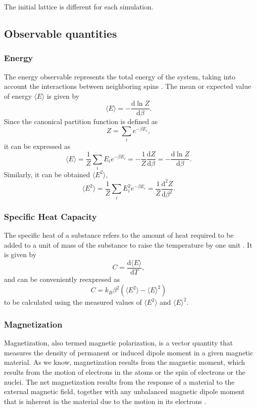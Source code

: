 \documentclass[
    10pt,
    journal,
    compsoc,
    english
]{IEEEtran}
\begin{document}
The initial lattice is different for each simulation.

\subsection{Observable quantities}
\subsubsection{Energy}
The energy observable represents the total energy of the system, taking into account the interactions between neighboring spins \cite{Blundell}. The mean or expected value of energy  $\langle E \rangle$ is given by 
\[\langle E \rangle  = -\dfrac{\text{d} \ln Z}{\text{d}\beta}. \]
Since the canonical partition function is defined as 
\[Z = \sum_ie^{-\beta E_i}, \]
it can be expressed as
\[\langle E \rangle = \dfrac{1}{Z}\sum_i E_ie^{-\beta E_i} = -\dfrac{1}{Z} \dfrac{\text{d}Z}{\text{d}\beta} = -\dfrac{\text{d} \ln Z}{\text{d}\beta}. \]
Similarly, it can be obtained $\langle E^2 \rangle$,
\[\langle E^2 \rangle = \dfrac{1}{Z}\sum_i E_i^2 e^{-\beta E_i} = \dfrac{1}{Z} \dfrac{\text{d}^2 Z}{\text{d}\beta^2}. \]


\subsubsection{Specific Heat Capacity}
The specific heat of a substance refers to the amount of heat required to be added to a unit of mass of the substance to raise the temperature by one unit \cite{Blundell}. It is given by
\[ C = \frac{\text{d} \langle E\rangle}{\text{d} T}, \]
and can be conveniently reexpresed as
\[ C = k_B \beta^2(\langle E^2\rangle - \langle E\rangle^2)\]
to be calculated using the measured values of $\langle E^2\rangle$ and $\langle E\rangle^2$.

\subsubsection{Magnetization}
Magnetization, also termed magnetic polarization, is a vector quantity that measures the density of permanent or induced dipole moment in a given magnetic material. As we know, magnetization results from the magnetic moment, which results from the motion of electrons in the atoms or the spin of electrons or the nuclei. The net magnetization results from the response of a material to the external magnetic field, together with any unbalanced magnetic dipole moment that is inherent in the material due to the motion in its electrons \cite{Megnetization}. 
\end{document}
